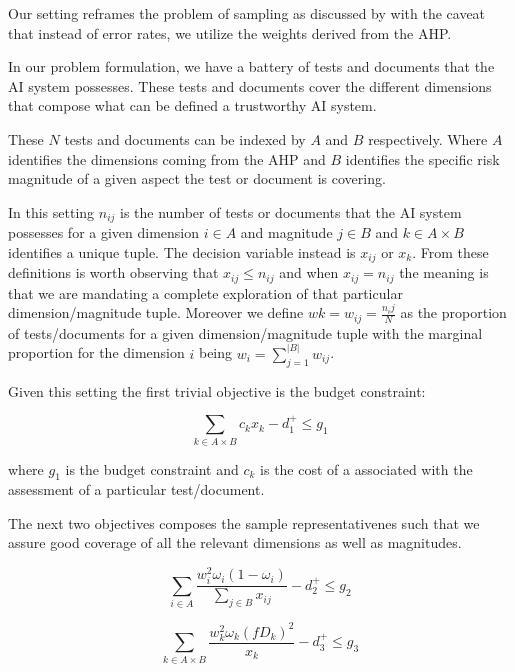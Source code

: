 Our setting reframes the problem of sampling as discussed by \cite{tayi_1985} with the caveat that instead of error rates, we utilize the weights derived from the AHP.

In our problem formulation, we have a battery of tests and documents that the AI system possesses. 
These tests and documents cover the different dimensions that compose what can be defined a trustworthy AI system.

These $N$ tests and documents can be indexed by $A$ and $B$ respectively.
Where $A$ identifies the dimensions coming from the AHP and $B$ identifies the specific risk magnitude of a given aspect the test or document is covering.

In this setting $n_{ij}$ is the number of tests or documents that the AI system possesses for a given dimension $i \in A$ and magnitude $j \in B$ and $k \in A \times B$ identifies a unique tuple.
The decision variable instead is $x_{ij}$ or $x_{k}$.
From these definitions is worth observing that $x_{ij} \leq n_{ij}$ and when $x_{ij} = n_{ij}$ the meaning is that we are mandating a complete exploration of that particular dimension/magnitude tuple.
Moreover we define $w{k} = w_{ij} = \frac{n_ij}{N}$ as the proportion of tests/documents for a given dimension/magnitude tuple with the marginal proportion for the dimension $i$ being $w_i = \sum_{j=1}^{|B|} w_{ij}$.

Given this setting the first trivial objective is the budget constraint:

\begin{equation}
    \sum_{k \in A \times B} c_{k} x_{k} - d_1^+ \leq g_1
\end{equation}

where $g_1$ is the budget constraint and $c_{k}$ is the cost of a associated with the assessment of a particular test/document.

The next two objectives composes the sample representativenes such that we assure good coverage of all the relevant dimensions as well as magnitudes.

\begin{equation}
\sum_{i \in A} \frac{w^2_i \omega_i (1-\omega_i)}{\sum_{j \in B} x_{ij}} - d_2^+ \leq g_2
\end{equation}

\begin{equation}
\sum_{k \in A \times B} \frac{w^2_{k} \omega_k(fD_k)^2}{x_{k}} - d_3^+ \leq g_3
\end{equation}

